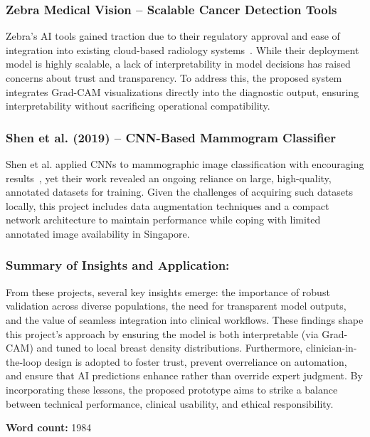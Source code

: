 \documentclass[12pt]{article}
\begin{document}
\subsubsection{Zebra Medical Vision – Scalable Cancer Detection Tools~\cite{12}} 
    Zebra’s AI tools gained traction due to their regulatory approval and ease of integration into existing cloud-based radiology systems~\cite{12}. While their deployment model is highly scalable, a lack of interpretability in model decisions has raised concerns about trust and transparency. To address this, the proposed system integrates Grad-CAM visualizations directly into the diagnostic output, ensuring interpretability without sacrificing operational compatibility.

\subsubsection{Shen et al. (2019) – CNN-Based Mammogram Classifier~\cite{7}} 
    Shen et al. applied CNNs to mammographic image classification with encouraging results~\cite{7}, yet their work revealed an ongoing reliance on large, high-quality, annotated datasets for training. Given the challenges of acquiring such datasets locally, this project includes data augmentation techniques and a compact network architecture to maintain performance while coping with limited annotated image availability in Singapore.


\subsubsection{Summary of Insights and Application:} 
From these projects, several key insights emerge: the importance of robust validation across diverse populations, the need for transparent model outputs, and the value of seamless integration into clinical workflows. These findings shape this project’s approach by ensuring the model is both interpretable (via Grad-CAM) and tuned to local breast density distributions. Furthermore, clinician-in-the-loop design is adopted to foster trust, prevent overreliance on automation, and ensure that AI predictions enhance rather than override expert judgment. By incorporating these lessons, the proposed prototype aims to strike a balance between technical performance, clinical usability, and ethical responsibility.

\vspace{2em}
\noindent\textbf{Word count:} 1984

\newpage
\end{document}
